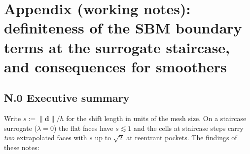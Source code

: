 
\section*{Appendix (working notes): definiteness of the SBM boundary terms at the surrogate staircase, and consequences for smoothers}

\subsection*{N.0 Executive summary}

Write $s := \|\mathbf d\|/h$ for the shift length in units of the mesh size.
On a staircase surrogate ($\lambda = 0$) the flat faces have $s \lesssim 1$
and the cells at staircase steps carry \emph{two} extrapolated faces with
$s$ up to $\sqrt 2$ at reentrant pockets. The findings of these notes:

